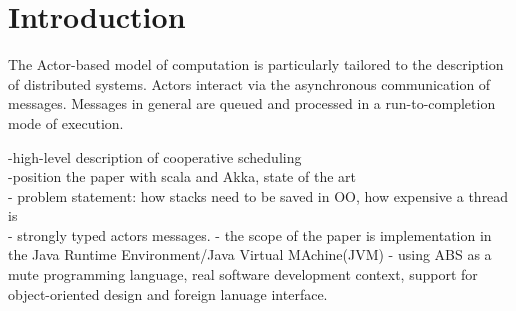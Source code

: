 \section{Introduction}

The Actor-based model of computation is particularly tailored to the description
of distributed systems.  Actors interact via the asynchronous communication of messages.
Messages in general are queued and processed in a run-to-completion mode of execution.


-high-level description of cooperative scheduling\\
-position the paper with scala and Akka, state of the art\\
- problem statement: how stacks need to be saved in OO, how expensive a thread is\\
- strongly typed actors messages.
- the scope of the paper is implementation in the Java Runtime Environment/Java Virtual MAchine(JVM)
- using ABS as a mute programming language, real software development context, support for object-oriented design and foreign lanuage interface.
